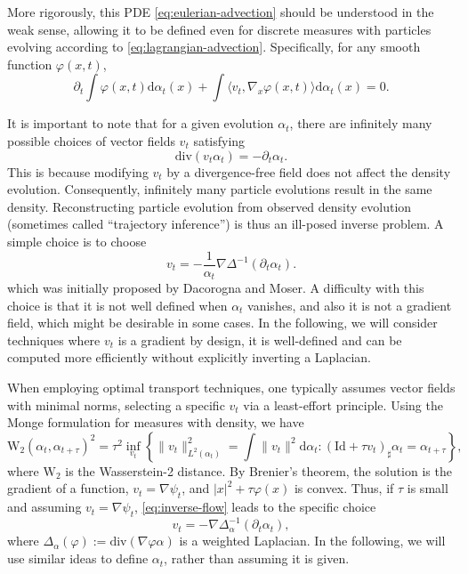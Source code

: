 More rigorously, this PDE \eqref{eq:eulerian-advection} should be understood in the weak sense, allowing it to be defined even for discrete measures with particles evolving according to \eqref{eq:lagrangian-advection}. Specifically, for any smooth function $\varphi(x, t)$,
\begin{equation*}
    \partial_t \int \varphi(x, t) \mathrm{d} \alpha_t(x) 
    + \int \langle v_t, \nabla_x \varphi(x, t) \rangle \mathrm{d} \alpha_t(x) = 0.
\end{equation*}

It is important to note that for a given evolution $\alpha_t$, there are infinitely many possible choices of vector fields $v_t$ satisfying
\begin{equation}
    \mathrm{div}(v_t \alpha_t) = -\partial_t \alpha_t. \label{eq:inverse-flow}
\end{equation}
This is because modifying $v_t$ by a divergence-free field does not affect the density evolution. Consequently, infinitely many particle evolutions result in the same density. Reconstructing particle evolution from observed density evolution (sometimes called ``trajectory inference'') is thus an ill-posed inverse problem.
%
A simple choice is to choose  
\begin{equation}\label{eq:dacorogna-moser}
    v_t = - \frac{1}{\alpha_t} \nabla \Delta^{-1}(\partial_t \alpha_t).
\end{equation}
which was initially proposed by Dacorogna and Moser. A difficulty with this choice is that it is not well defined when $\alpha_t$ vanishes, and also it is not a gradient field, which might be desirable in some cases. In the following, we will consider techniques where $v_t$ is a gradient by design, it is well-defined and can be computed more efficiently without explicitly inverting a Laplacian.  

When employing optimal transport techniques, one typically assumes vector fields with minimal norms, selecting a specific $v_t$ via a least-effort principle. Using the Monge formulation for measures with density, we have
\begin{equation}
    \mathrm{W}_2(\alpha_t, \alpha_{t+\tau})^2 = \tau^2 \inf_{v_t} \left\{ \|v_t\|_{L^2(\alpha_t)}^2 = \int \|v_t\|^2 \mathrm{d} \alpha_t : (\mathrm{Id} + \tau v_t)_\sharp \alpha_t = \alpha_{t+\tau} \right\}, \label{eq:monge-field}
\end{equation}
where $\mathrm{W}_2$ is the Wasserstein-2 distance. By Brenier's theorem, the solution is the gradient of a function, $v_t = \nabla \psi_t$, and $|x|^2 + \tau \varphi(x)$ is convex. Thus, if $\tau$ is small and assuming $v_t = \nabla \psi_t$, \eqref{eq:inverse-flow} leads to the specific choice
\begin{equation*}
    v_t = -  \nabla \Delta_\alpha^{-1}(\partial_t \alpha_t),
\end{equation*}
where $\Delta_\alpha(\varphi) := \mathrm{div}(\nabla \varphi \alpha)$ is a weighted Laplacian. 
%
In the following, we will use similar ideas to define $\alpha_t$, rather than assuming it is given.


